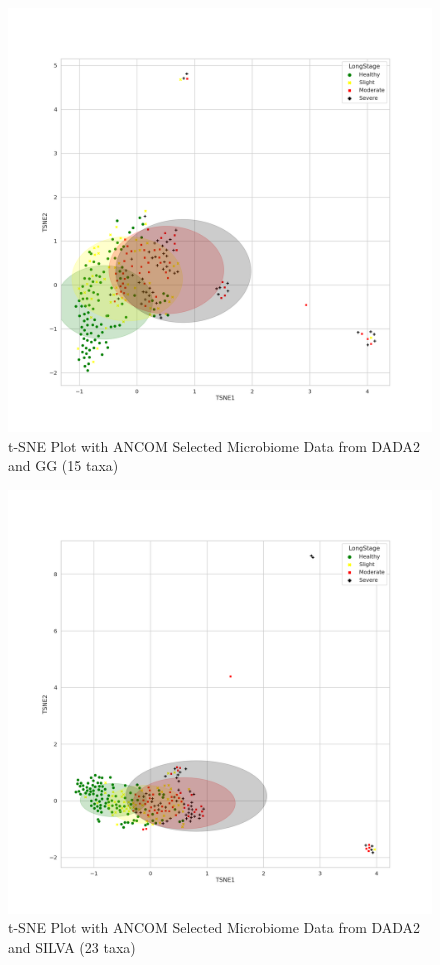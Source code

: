 \documentclass[a4paper]{article}
\begin{document}
            \begin{figure}[p]
                \centering
                \includegraphics[width=0.6 \linewidth]{figures/tSNE/ANCOM/ANCOM.DADA2.gg.png}
                \caption{t-SNE Plot with ANCOM Selected Microbiome Data from DADA2 and GG (15 taxa)}
                \label{fig:tsne-ANCOM-dada2-gg}
            \end{figure}

            \begin{figure}[p]
                \centering
                \includegraphics[width=0.6 \linewidth]{figures/tSNE/ANCOM/ANCOM.DADA2.silva.png}
                \caption{t-SNE Plot with ANCOM Selected Microbiome Data from DADA2 and SILVA (23 taxa)}
                \label{fig:tsne-ANCOM-dada2-silva}
            \end{figure}
\end{document}
